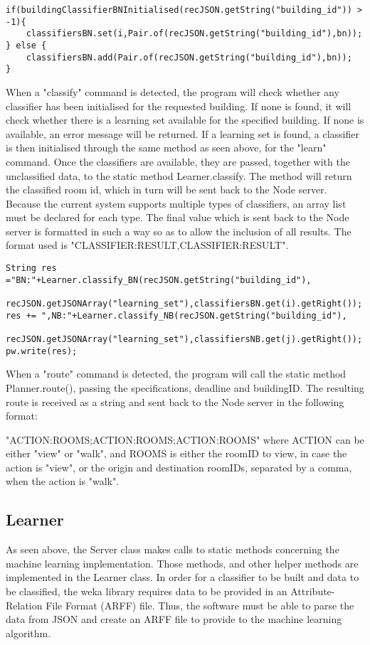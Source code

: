 \begin{lstlisting}
if(buildingClassifierBNInitialised(recJSON.getString("building_id")) > -1){
	classifiersBN.set(i,Pair.of(recJSON.getString("building_id"),bn));
} else {
	classifiersBN.add(Pair.of(recJSON.getString("building_id"),bn));
}
\end{lstlisting}

When a "classify" command is detected, the program will check whether any classifier has been initialised for the requested building. If none is found, it will check whether there is a learning set available for the specified building. If none is available, an error message will be returned. If a learning set is found, a classifier is then initialised through the same method as seen above, for the "learn" command. Once the classifiers are available, they are passed, together with the unclassified data, to the static method Learner.classify. The method will return the classified room id, which in turn will be sent back to the Node server. Because the current system supports multiple types of classifiers, an array list must be declared for each type. The final value which is sent back to the Node server is formatted in such a way so as to allow the inclusion of all results. The format used is "CLASSIFIER:RESULT,CLASSIFIER:RESULT".
\begin{lstlisting}
String res ="BN:"+Learner.classify_BN(recJSON.getString("building_id"),
                  	recJSON.getJSONArray("learning_set"),classifiersBN.get(i).getRight());
res += ",NB:"+Learner.classify_NB(recJSON.getString("building_id"),
              	recJSON.getJSONArray("learning_set"),classifiersNB.get(j).getRight());
pw.write(res);
\end{lstlisting} 

When a "route" command is detected, the program will call the static method Planner.route(), passing the specifications, deadline and buildingID. The resulting route is received as a string and sent back to the Node server in the following format: 

\noindent "ACTION:ROOMS;ACTION:ROOMS;ACTION:ROOMS" where ACTION can be either "view" or "walk", and ROOMS is either the roomID to view, in case the action is "view", or the origin and destination roomIDs, separated by a comma, when the action is "walk".

\subsection{Learner}
As seen above, the Server class makes calls to static methods concerning the machine learning implementation. Those methods, and other helper methods are implemented in the Learner class. In order for a classifier to be built and data to be classified, the weka library requires data to be provided in an Attribute-Relation File Format (ARFF) file. Thus, the software must be able to parse the data from JSON and create an ARFF file to provide to the machine learning algorithm.

